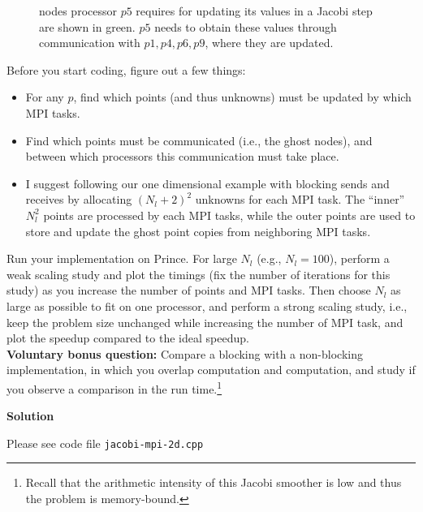 \documentclass[12pt]{article}
\begin{document}
\begin{enumerate}
\begin{figure}[bht]
{  nodes processor $p5$ requires for updating its values in a Jacobi
  step are shown in green. $p5$ needs to obtain these values through
  communication with $p1,p4,p6,p9$, where they are
  updated.\label{fig}}
\end{figure}
  Before you start coding, figure out a few things:
  \begin{itemize}
    \item For any $p$, find which points (and thus unknowns) must be
      updated by which MPI tasks.
    \item Find which points must be communicated (i.e., the ghost nodes), and between which
      processors this communication must take place.
    \item I suggest following our one dimensional example with blocking
      sends and receives by allocating $(N_l+2)^2$ unknowns for each
      MPI task. The ``inner'' $N_l^2$ points are processed by each MPI
      tasks, while the outer points are used to store and update the
      ghost point copies from neighboring MPI tasks.
  \end{itemize}
Run your implementation on Prince. For large $N_l$ (e.g.,
$N_l=100$), perform a weak scaling study and plot the timings (fix the
number of iterations for this study) as you increase the number of
points and MPI tasks. Then choose $N_l$ as large as possible to fit on
one processor, and perform a strong scaling study, i.e., keep the
problem size unchanged while increasing the number of MPI task, and
plot the speedup compared to the ideal speedup.\\ {\bf Voluntary bonus
  question:} Compare a blocking with a non-blocking implementation, in
which you overlap computation and computation, and study if you
observe a comparison in the run time.\footnote{%
  Recall that the arithmetic intensity of this Jacobi smoother is low
  and thus the problem is memory-bound.}
  
  \textbf{Solution}
  
  Please see code file \texttt{jacobi-mpi-2d.cpp}



\end{enumerate}
\end{document}
